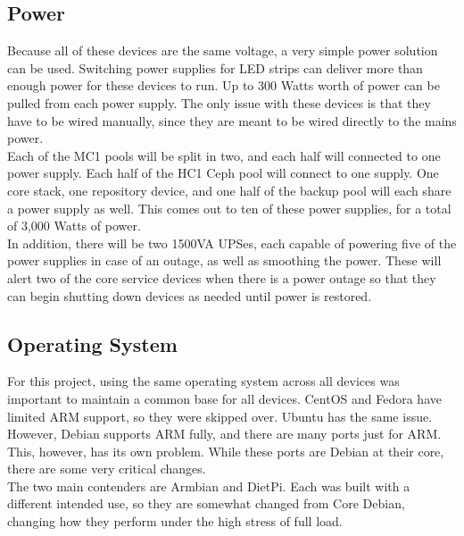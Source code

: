 \documentclass[12pt]{spieman}  %
\begin{document}
\subsection{Power}
\label{subsec:arm-power}

Because all of these devices are the same voltage, a very simple power solution can be used. Switching power supplies for LED strips can deliver more than enough power for these devices to run. Up to 300 Watts worth of power can be pulled from each power supply. The only issue with these devices is that they have to be wired manually, since they are meant to be wired directly to the mains power.\\

Each of the MC1 pools will be split in two, and each half will connected to one power supply. Each half of the HC1 Ceph pool will connect to one supply. One core stack, one repository device, and one half of the backup pool will each share a power supply as well. This comes out to ten of these power supplies, for a total of 3,000 Watts of power. \\

In addition, there will be two 1500VA UPSes, each capable of powering five of the power supplies in case of an outage, as well as smoothing the power. These will alert two of the core service devices when there is a power outage so that they can begin shutting down devices as needed until power is restored.

\subsection{Operating System}
\label{subsec:arm-os}

For this project, using the same operating system across all devices was important to maintain a common base for all devices. CentOS and Fedora have limited ARM support, so they were skipped over. Ubuntu has the same issue. However, Debian supports ARM fully, and there are many ports just for ARM. This, however, has its own problem. While these ports are Debian at their core, there are some very critical changes.\\

The two main contenders are Armbian and DietPi. Each was built with a different intended use, so they are somewhat changed from Core Debian, changing how they perform under the high stress of full load.\\
\end{document}
